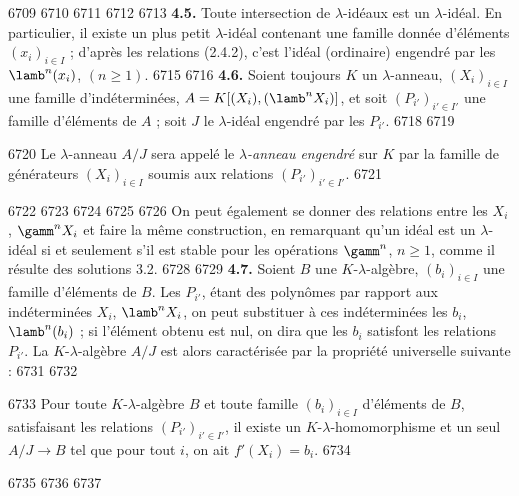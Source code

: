   6709	
  6710	%
  6711	%
  6712	%
  6713		\noindent\textbf{4.5.} Toute intersection de $\lambda$-id\'eaux est un $\lambda$-id\'eal. En particulier, il existe un plus petit $\lambda$-id\'eal contenant une famille donn\'ee d'\'el\'ements $(x_i)_{i \in I}$ ; d'apr\`es les relations (2.4.2), c'est l'id\'eal (ordinaire) engendr\'e par les $\lamb^n(x_i)$, $(n \geq 1)$.
  6715	
  6716		\noindent\textbf{4.6.} Soient toujours $K$ un $\lambda$-anneau, $(X_i)_{i \in I}$ une famille d'ind\'etermin\'ees, $A = K[(X_i), (\lamb^n X_i)]$, et soit $(P_{i'})_{i' \in I'}$ une famille d'\'el\'ements de $A$ ; soit $J$ le $\lambda$-id\'eal engendr\'e par les $P_{i'}$.
  6718	
  6719	\begin{definition}
  6720	Le $\lambda$-anneau $A/J$ sera appel\'e le \emph{$\lambda$-anneau engendr\'e} sur $K$ par la famille de g\'en\'erateurs $(X_i)_{i \in I}$ soumis aux relations $(P_{i'})_{i' \in I'}$.
  6721	\end{definition}
  6722	
  6723	%
  6724	%
  6725	%
  6726		\noindent On peut \'egalement se donner des relations entre les $X_i$, $\gamm^n X_i$ et faire la m\^eme construction, en remarquant qu'un id\'eal est un $\lambda$-id\'eal si et seulement s'il est stable pour les op\'erations $\gamm^n$, $n \geq 1$, comme il r\'esulte des solutions 3.2.
  6728	
  6729		\noindent\textbf{4.7.} Soient $B$ une $K$-$\lambda$-alg\`ebre, $(b_i)_{i \in I}$ une famille d'\'el\'ements de $B$. Les $P_{i'}$, \'etant des polyn\^omes par rapport aux ind\'etermin\'ees $X_i$, $\lamb^n X_i$, on peut substituer \`a ces ind\'etermin\'ees les $b_i$, $\lamb^n(b_i)$ ; si l'\'el\'ement obtenu est nul, on dira que les $b_i$ satisfont les relations $P_{i'}$. La $K$-$\lambda$-alg\`ebre $A/J$ est alors caract\'eris\'ee par la propri\'et\'e universelle suivante :
  6731	
  6732	\begin{proposition}
  6733	Pour toute $K$-$\lambda$-alg\`ebre $B$ et toute famille $(b_i)_{i \in I}$ d'\'el\'ements de $B$, satisfaisant les relations $(P_{i'})_{i' \in I'}$, il existe un $K$-$\lambda$-homomorphisme et un seul $A/J \to B$ tel que pour tout $i$, on ait $f'(X_i) = b_i$.
  6734	\end{proposition}
  6735	
  6736	%
  6737	%
